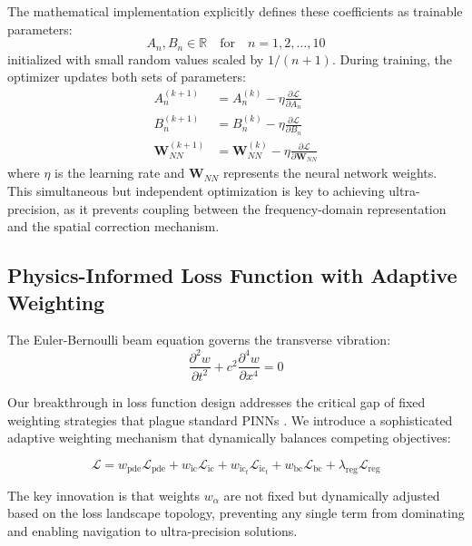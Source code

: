 The mathematical implementation explicitly defines these coefficients as trainable parameters:
\begin{equation}
A_n, B_n \in \mathbb{R} \quad \text{for} \quad n = 1, 2, \ldots, 10
\end{equation}
initialized with small random values scaled by $1/(n+1)$. During training, the optimizer updates both sets of parameters:
\begin{align}
A_n^{(k+1)} &= A_n^{(k)} - \eta \frac{\partial \mathcal{L}}{\partial A_n} \\
B_n^{(k+1)} &= B_n^{(k)} - \eta \frac{\partial \mathcal{L}}{\partial B_n} \\
\mathbf{W}_{NN}^{(k+1)} &= \mathbf{W}_{NN}^{(k)} - \eta \frac{\partial \mathcal{L}}{\partial \mathbf{W}_{NN}}
\end{align}
where $\eta$ is the learning rate and $\mathbf{W}_{NN}$ represents the neural network weights. This simultaneous but independent optimization is key to achieving ultra-precision, as it prevents coupling between the frequency-domain representation and the spatial correction mechanism.

\subsection{Physics-Informed Loss Function with Adaptive Weighting}

The Euler-Bernoulli beam equation governs the transverse vibration:
\begin{equation}
\frac{\partial^2 w}{\partial t^2} + c^2 \frac{\partial^4 w}{\partial x^4} = 0
\label{eq:euler_bernoulli}
\end{equation}

Our breakthrough in loss function design addresses the critical gap of fixed weighting strategies that plague standard PINNs \cite{mcclenny2023self}. We introduce a sophisticated adaptive weighting mechanism that dynamically balances competing objectives:

\begin{equation}
\mathcal{L} = w_{\text{pde}} \mathcal{L}_{\text{pde}} + w_{\text{ic}} \mathcal{L}_{\text{ic}} + w_{\text{ic}_t} \mathcal{L}_{\text{ic}_t} + w_{\text{bc}} \mathcal{L}_{\text{bc}} + \lambda_{\text{reg}} \mathcal{L}_{\text{reg}}
\end{equation}

The key innovation is that weights $w_{\alpha}$ are not fixed but dynamically adjusted based on the loss landscape topology, preventing any single term from dominating and enabling navigation to ultra-precision solutions.

